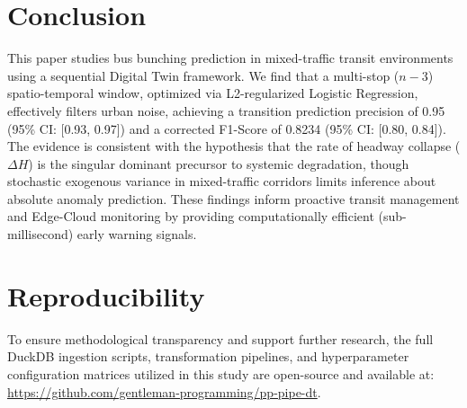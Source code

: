 \documentclass[journal,twocolumn]{IEEEtran}
\begin{document}
\section{Conclusion}
This paper studies bus bunching prediction in mixed-traffic transit environments using a sequential Digital Twin framework. We find that a multi-stop ($n-3$) spatio-temporal window, optimized via L2-regularized Logistic Regression, effectively filters urban noise, achieving a transition prediction precision of 0.95 (95\% CI: [0.93, 0.97]) and a corrected F1-Score of 0.8234 (95\% CI: [0.80, 0.84]). The evidence is consistent with the hypothesis that the rate of headway collapse ($\Delta H$) is the singular dominant precursor to systemic degradation, though stochastic exogenous variance in mixed-traffic corridors limits inference about absolute anomaly prediction. These findings inform proactive transit management and Edge-Cloud monitoring by providing computationally efficient (sub-millisecond) early warning signals.

\section*{Reproducibility}
To ensure methodological transparency and support further research, the full DuckDB ingestion scripts, transformation pipelines, and hyperparameter configuration matrices utilized in this study are open-source and available at: \url{https://github.com/gentleman-programming/pp-pipe-dt}.
\end{document}
